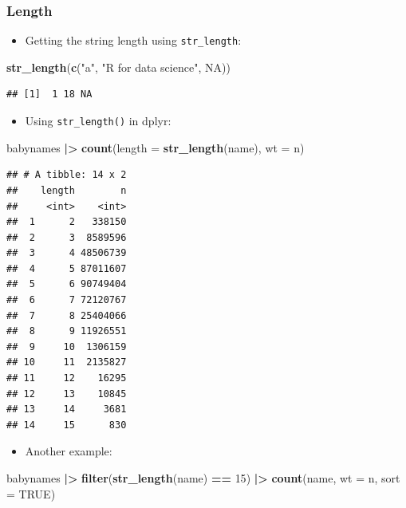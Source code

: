 \documentclass[
]{article}
\newenvironment{Shaded}{\begin{snugshade}}{\end{snugshade}}
\newcommand{\AttributeTok}[1]{\textcolor[rgb]{0.13,0.29,0.53}{#1}}
\newcommand{\ConstantTok}[1]{\textcolor[rgb]{0.56,0.35,0.01}{#1}}
\newcommand{\DecValTok}[1]{\textcolor[rgb]{0.00,0.00,0.81}{#1}}
\newcommand{\FunctionTok}[1]{\textcolor[rgb]{0.13,0.29,0.53}{\textbf{#1}}}
\newcommand{\NormalTok}[1]{#1}
\newcommand{\SpecialCharTok}[1]{\textcolor[rgb]{0.81,0.36,0.00}{\textbf{#1}}}
\newcommand{\StringTok}[1]{\textcolor[rgb]{0.31,0.60,0.02}{#1}}
\providecommand{\tightlist}{%
  \setlength{\itemsep}{0pt}\setlength{\parskip}{0pt}}
\begin{document}
\subsubsection{Length}\label{length}

\begin{itemize}
\tightlist
\item
  Getting the string length using \texttt{str\_length}:
\end{itemize}

\begin{Shaded}
\begin{Highlighting}[]
\FunctionTok{str\_length}\NormalTok{(}\FunctionTok{c}\NormalTok{(}\StringTok{"a"}\NormalTok{, }\StringTok{"R for data science"}\NormalTok{, }\ConstantTok{NA}\NormalTok{))}
\end{Highlighting}
\end{Shaded}

\begin{verbatim}
## [1]  1 18 NA
\end{verbatim}

\begin{itemize}
\tightlist
\item
  Using \texttt{str\_length()} in dplyr:
\end{itemize}

\begin{Shaded}
\begin{Highlighting}[]
\NormalTok{babynames }\SpecialCharTok{|\textgreater{}} 
  \FunctionTok{count}\NormalTok{(}\AttributeTok{length =} \FunctionTok{str\_length}\NormalTok{(name), }\AttributeTok{wt =}\NormalTok{ n)}
\end{Highlighting}
\end{Shaded}

\begin{verbatim}
## # A tibble: 14 x 2
##    length        n
##     <int>    <int>
##  1      2   338150
##  2      3  8589596
##  3      4 48506739
##  4      5 87011607
##  5      6 90749404
##  6      7 72120767
##  7      8 25404066
##  8      9 11926551
##  9     10  1306159
## 10     11  2135827
## 11     12    16295
## 12     13    10845
## 13     14     3681
## 14     15      830
\end{verbatim}

\begin{itemize}
\tightlist
\item
  Another example:
\end{itemize}

\begin{Shaded}
\begin{Highlighting}[]
\NormalTok{babynames }\SpecialCharTok{|\textgreater{}} 
  \FunctionTok{filter}\NormalTok{(}\FunctionTok{str\_length}\NormalTok{(name) }\SpecialCharTok{==} \DecValTok{15}\NormalTok{) }\SpecialCharTok{|\textgreater{}} 
  \FunctionTok{count}\NormalTok{(name, }\AttributeTok{wt =}\NormalTok{ n, }\AttributeTok{sort =} \ConstantTok{TRUE}\NormalTok{)}
\end{Highlighting}
\end{Shaded}
\end{document}
